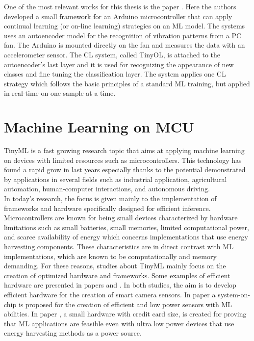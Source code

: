 \documentclass[12pt]{report}
\begin{document}
One of the most relevant works for this thesis is the paper \cite{ren2021tinyol}. Here the authors developed a small framework for an Arduino microcontroller that can apply continual learning (or on-line learning) strategies on an ML model. The systems uses an autoencoder model for the recognition of vibration patterns from a PC fan. The Arduino is mounted directly on the fan and measures the data with an accelerometer sensor. The CL system, called TinyOL, is attached to the autoencoder's last layer and it is used for recognizing the appearance of new classes and fine tuning the classification layer. The system applies one CL strategy which follows the basic principles of a standard ML training, but applied in real-time on one sample at a time. 

\section{Machine Learning on MCU}
TinyML is a fast growing research topic that aims at applying machine learning on devices with limited resources such as microcontrollers. This technology has found a rapid grow in last years especially thanks to the potential demonstrated by applications in several fields such as industrial application, agricultural automation, human-computer interactions, and autonomous driving. \\
In today's research, the focus is given mainly to the implementation of frameworks and hardware specifically designed for efficient inference. Microcontrollers are known for being small devices characterized by hardware limitations such as small batteries, small memories, limited computational power, and scarce availability of energy which concerns implementations that use energy harvesting components. These characteristics are in direct contrast with ML implementations, which are known to be computationally and memory demanding. For these reasons, studies about TinyML mainly focus on the creation of optimized hardware and frameworks. Some examples of efficient hardware are presented in papers \cite{jokic2021battery} and \cite{jokic2021sub}. In both studies, the aim is to develop efficient hardware for the creation of smart camera sensors. In paper \cite{jokic2021sub} a system-on-chip is proposed for the creation of efficient and low power sensors with ML abilities. In paper \cite{jokic2021battery}, a small hardware with credit card size, is created for proving that ML applications are feasible even with ultra low power devices that use energy harvesting methods as a power source.\\
\end{document}
